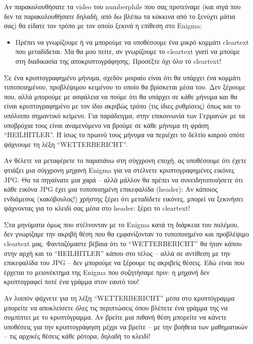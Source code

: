 \documentclass[a4paper,twoside,12pt]{article}
\begin{document}
Αν παρακολουθήσατε τα video του numberphile που σας προτείναμε (και σιγά που δεν τα παρακολουθήσατε δηλαδή, από δω βλέπω τα κόκκινα από το ξενύχτι  μάτια σας) θα είδατε τον τρόπο με τον οποίο ξεκινά η επίθεση στο Enigma:

\begin{itemize}
\item Πρέπει να γνωρίζουμε ή να μπορούμε να υποθέσουμε ένα μικρό κομμάτι cleartext που μεταδίδεται. Μα θα μου πείτε, αν γνωρίζουμε το cleartext γιατί να μπούμε στη διαδικασία της αποκρυπτογράφησης. Προσέξτε όχι όλο το cleartext!
\end{itemize}

Σε ένα κρυπτογραφημένο μήνυμα, σχεδόν μοιραίο είναι ότι θα υπάρχει ένα κομμάτι τυποποιημένου, προβλέψιμου κειμένου το οποίο θα βρίσκεται μέσα του. Δεν ξέρουμε που, αλλά μπορούμε με ασφάλεια να πούμε ότι θα υπάρχει σε κάθε μήνυμα και θα είναι κρυπτογραφημένο με τον ίδιο ακριβώς τρόπο (τις ίδιες ρυθμίσεις) όπως και το υπόλοιπο σημαντικό κείμενο. Για παράδειγμα, στην επικοινωνία των Γερμανών με τα υποβρύχια τους είναι αναμενόμενο να βρούμε σε κάθε μήνυμα τη φράση “HEILHITLER”. Ή ίσως το πρωινό τους μήνυμα να περιέχει το δελτίο καιρού οπότε ψάχνουμε τη λέξη “WETTERBERICHT”.

Αν θέλετε να μεταφέρετε το παραπάνω στη σύγχρονη εποχή, ας υποθέσουμε ότι έχετε φτιάξει μια σύγχρονη μηχανή Enigma για να στέλνετε κρυπτογραφημένες εικόνες JPG. Θα τα πηγαίνατε μια χαρά – αλλά μάλλον θα πρέπει να συνειδητοποιήσετε ότι κάθε εικόνα JPG έχει μια τυποποιημένη επικεφαλίδα (header): Αν κάποιος ενδιάμεσος (κακόβουλος!) χρήστης ξέρει ότι μεταδίδετε εικόνες, μπορεί να ξεκινήσει ψάχνοντας για το κλειδί σας μέσα στο header: ξέρει το cleartext!

Στα μηνύματα όμως που στέλνονταν με το Enigma κατά τη διάρκεια του πολέμου, δεν γνωρίζαμε την ακριβή θέση που θα εμφανίζονταν το τυποποιημένο και προβλέψιμο cleartext μας. Φανταζόμαστε βέβαια ότι το “WETTERBERICHT” θα ήταν κάπου στην αρχή και το “HEILHITLER” κάπου στο τέλος – αλλά σε αντίθεση με την επικεφαλίδα του JPG – δεν μπορούμε να ξέρουμε τις ακριβείς θέσεις. Εδώ είναι που έρχεται το μειονέκτημα της Enigma που συζητήσαμε πριν: η μηχανή δεν κρυπτογραφεί ποτέ ένα γράμμα στον εαυτό του!

Αν λοιπόν ψάχνετε για τη λέξη “WETTERBERICHT” μέσα στο κρυπτόγραμμα μπορείτε να αποκλείσετε όλες τις περιπτώσεις όπου βλέπετε ένα γράμμα της να συμπίπτει με το κρυπτόγραμμα. Αν βρείτε μια πιθανή θέση μπορείτε να κάνετε υποθέσεις για την κρυπτογράφηση μέχρι να βρείτε – με την βοήθεια των μαθηματικών – τις αρχικές θέσεις κάθε ρότορα, δηλαδή το κλειδί!
\end{document}

